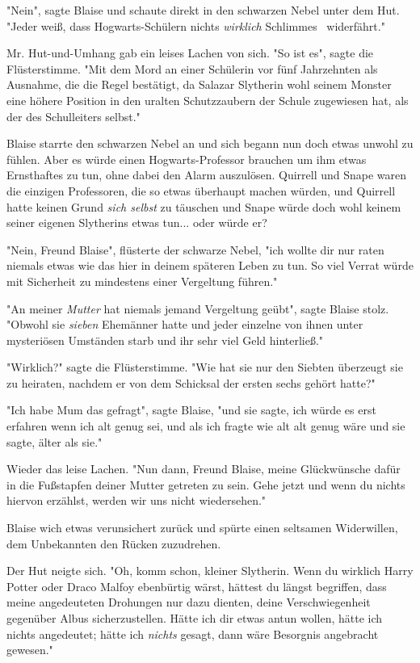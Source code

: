 {"Nein", sagte Blaise und schaute direkt in den schwarzen Nebel unter dem Hut. "Jeder weiß, dass Hogwarts-Schülern nichts \emph{wirklich} Schlimmes ~widerfährt."

Mr. Hut-und-Umhang gab ein leises Lachen von sich. "So ist es", sagte die Flüsterstimme. "Mit dem Mord an einer Schülerin vor fünf Jahrzehnten als Ausnahme, die die Regel bestätigt, da Salazar Slytherin wohl seinem Monster eine höhere Position in den uralten Schutzzaubern der Schule zugewiesen hat, als der des Schulleiters selbst."

Blaise starrte den schwarzen Nebel an und sich begann nun doch etwas unwohl zu fühlen. Aber es würde einen Hogwarts-Professor brauchen um ihm etwas Ernsthaftes zu tun, ohne dabei den Alarm auszulösen. Quirrell und Snape waren die einzigen Professoren, die so etwas überhaupt machen würden, und Quirrell hatte keinen Grund \emph{sich selbst} zu täuschen und Snape würde doch wohl keinem seiner eigenen Slytherins etwas tun... oder würde er?

"Nein, Freund Blaise", flüsterte der schwarze Nebel, "ich wollte dir nur raten niemals etwas wie das hier in deinem späteren Leben zu tun. So viel Verrat würde mit Sicherheit zu mindestens einer Vergeltung führen."

"An meiner \emph{Mutter} hat niemals jemand Vergeltung geübt", sagte Blaise stolz. "Obwohl sie \emph{sieben} Ehemänner hatte und jeder einzelne von ihnen unter mysteriösen Umständen starb und ihr sehr viel Geld hinterließ."

"Wirklich?" sagte die Flüsterstimme. "Wie hat sie nur den Siebten überzeugt sie zu heiraten, nachdem er von dem Schicksal der ersten sechs gehört hatte?"

"Ich habe Mum das gefragt", sagte Blaise, "und sie sagte, ich würde es erst erfahren wenn ich alt genug sei, und als ich fragte wie alt alt genug wäre und sie sagte, älter als sie."

Wieder das leise Lachen. "Nun dann, Freund Blaise, meine Glückwünsche dafür in die Fußstapfen deiner Mutter getreten zu sein. Gehe jetzt und wenn du nichts hiervon erzählst, werden wir uns nicht wiedersehen."

Blaise wich etwas verunsichert zurück und spürte einen seltsamen Widerwillen, dem Unbekannten den Rücken zuzudrehen.

Der Hut neigte sich. "Oh, komm schon, kleiner Slytherin. Wenn du wirklich Harry Potter oder Draco Malfoy ebenbürtig wärst, hättest du längst begriffen, dass meine angedeuteten Drohungen nur dazu dienten, deine Verschwiegenheit gegenüber Albus sicherzustellen. Hätte ich dir etwas antun wollen, hätte ich nichts angedeutet; hätte ich \emph{nichts} gesagt, dann wäre Besorgnis angebracht gewesen."

}
